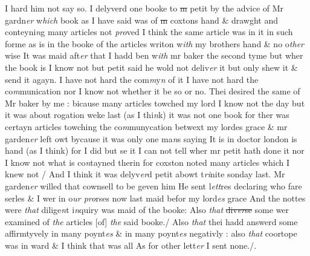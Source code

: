 \documentclass[12pt, a4paper]{book}
\begin{document}
				\marginpar[\vspace{0.5cm}{\textcolor{Gray}{19. 20.}}]{}
			 I hard him not say so. 
				\marginpar[\vspace{0.5cm}{\textcolor{Gray}{21.}}]{}
			 I delyverd one booke to \sout{m }petit by the advice of Mr gardn\textit{er} w\textit{hich} book as I have said was of \sout{m }coxtons hand \& drawght and conteyni\textit{n}g many articles not \textit{pro}ved 
				\marginpar[\vspace{0.5cm}{\textcolor{Gray}{22.}}]{}
			 I think the same article was in it in such forme as is in the booke of the articles writon w\textit{ith} my brothers hand \& no o\textit{ther }wise 
				\marginpar[\vspace{0.5cm}{\textcolor{Gray}{23.}}]{}
			 It was maid aft\textit{er} that I hadd ben w\textit{ith} mr baker the second tyme but wher the book is I know not but petit said he wold not  deliv\textit{er} it but only shew it \& send it agayn. 
				\marginpar[\vspace{0.5cm}{\textcolor{Gray}{24}}]{}
			 I have not hard the com\textit{m}y\textit{n} of it 
				\marginpar[\vspace{0.5cm}{\textcolor{Gray}{25.}}]{}
			 I have not hard the co\textit{m}munication nor I know not whether it  be so or no. 
				\marginpar[\vspace{0.5cm}{\textcolor{Gray}{[2]6.}}]{}
			 Thei desired the same of Mr baker by me : bicause many articles towched my lord 
				\marginpar[\vspace{0.5cm}{\textcolor{Gray}{[27]}}]{}
			 I know not the day but it was about rogation weke last (as I thi\textit{n}k) it was not one book for ther was certayn articles towching the co\textit{m}munycation betwext my lordes grace \& mr garden\textit{er} left owt bycause it was only one ma\textit{n}s saying 
				\marginpar[\vspace{0.5cm}{\textcolor{Gray}{[28]}}]{}
			 It is in doctor london is hand (as I think) for I did but se it I can not tell wher mr petit hath done it nor I know not what is co\textit{n}tayned therin for coxston noted many articles which I knew not / And I think it was delyv\textit{er}d petit abowt t\textit{ri}nite sonday last. 
				\marginpar[\vspace{0.5cm}{\textcolor{Gray}{[29]}}]{}
			 Mr garden\textit{er} willed that cownsell to be geven him 
				\marginpar[\vspace{0.5cm}{\textcolor{Gray}{[30]}}]{}
			 He sent l\textit{ett}res declaring who fare serles \& I wer in o\textit{ur pro}rses now last maid befor my lord\textit{es} grace And the nottes were \textit{that} dilige\textit{n}t i\textit{n}quiry was maid of the booke: Also \textit{that}
               \sout{div\textit{er}se }some wer examined of \textit{the} articles [of] \textit{the} said booke./ Also \textit{that} thei hadd answerd some affirmtyvely in many poynt\textit{es} \& in many poynt\textit{es} negativly : also \textit{that} coortope was in ward \& I think that was all 
				\marginpar[\vspace{0.5cm}{\textcolor{Gray}{31}}]{}
			 As for other lett\textit{er} I sent none./.
\end{document}

